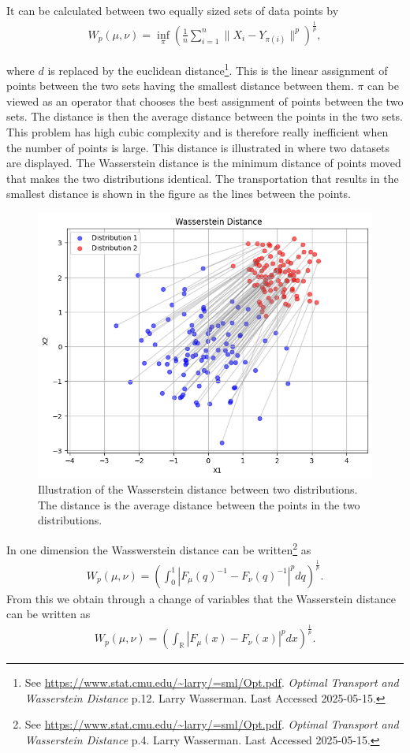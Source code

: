 \documentclass[%
a4paper,							
11pt,								
bibliography=totoc,						
abstracton=true					
]
{scrartcl}
\theoremstyle{plain}
\theoremstyle{definition}
\theoremstyle{remark}
\newcommand{\1}{\mathbbm{1}}
\begin{document}
It can be calculated between two equally sized sets of data points by
\begin{align*}
    W_p(\mu,\nu) =  \inf_{\pi} \left( \frac{1}{n} \sum_{i=1}^n \| X_i - Y_{\pi(i)}  \|^p \right)^{\frac{1}{p}},
\end{align*} 


where $d$ is replaced by the euclidean distance\footnote{See \url{https://www.stat.cmu.edu/~larry/=sml/Opt.pdf}. \textit{Optimal Transport and Wasserstein Distance} p.12. Larry Wasserman. Last Accessed 2025-05-15.}. This is the linear assignment of points between the two sets having the smallest distance between them. $\pi$ can be viewed as an operator that chooses the best assignment of points between the two sets. The distance is then the average distance between the points in the two sets. This problem has high cubic complexity and is therefore really inefficient when the number of points is large. This distance is illustrated in  where two datasets are displayed. The Wasserstein distance is the minimum distance of points moved that makes the two distributions identical. The transportation that results in the smallest distance is shown in the figure as the lines between the points. 
\begin{figure}
    \centering
    \includegraphics[width=0.5\linewidth]{3Theory/pictures/WassersteinIllustrated.png}
    \caption{Illustration of the Wasserstein distance between two distributions. The distance is the average distance between the points in the two distributions.}
    \label{fig:WassersteinDistance}
\end{figure}


In one dimension the Wasswerstein distance can be written\footnote{See \url{https://www.stat.cmu.edu/~larry/=sml/Opt.pdf}. \textit{Optimal Transport and Wasserstein Distance} p.4. Larry Wasserman. Last Accessed 2025-05-15.} as 
\begin{align*}
    W_p(\mu,\nu) = \left(  \int_{0}^1 |F_\mu(q)^{-1} - F_\nu(q)^{-1}|^p dq \right)^{\frac{1}{p}}.
\end{align*}
From this we obtain through a change of variables that the Wasserstein distance can be written as
\begin{align*}
    W_p(\mu,\nu) = \left( \int_{\mathbb{R}} |F_\mu(x) - F_\nu(x)|^p dx \right)^{\frac{1}{p}}. 
\end{align*}
\end{document}
